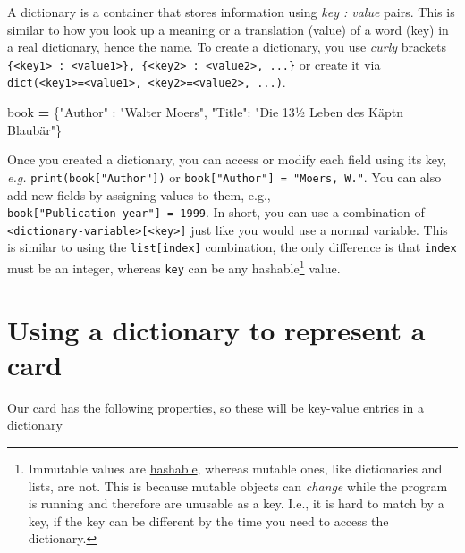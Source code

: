 \documentclass[
]{book}
\newenvironment{Shaded}{\begin{snugshade}}{\end{snugshade}}
\newcommand{\NormalTok}[1]{#1}
\newcommand{\OperatorTok}[1]{\textcolor[rgb]{0.81,0.36,0.00}{\textbf{#1}}}
\newcommand{\StringTok}[1]{\textcolor[rgb]{0.31,0.60,0.02}{#1}}
\begin{document}
A dictionary is a container that stores information using \emph{key : value} pairs. This is similar to how you look up a meaning or a translation (value) of a word (key) in a real dictionary, hence the name. To create a dictionary, you use \emph{curly} brackets \texttt{\{\textless{}key1\textgreater{}\ :\ \textless{}value1\textgreater{}\},\ \{\textless{}key2\textgreater{}\ :\ \textless{}value2\textgreater{},\ ...\}} or create it via \texttt{dict(\textless{}key1\textgreater{}=\textless{}value1\textgreater{},\ \textless{}key2\textgreater{}=\textless{}value2\textgreater{},\ ...)}.

\begin{Shaded}
\begin{Highlighting}[]
\NormalTok{book }\OperatorTok{=}\NormalTok{ \{}\StringTok{"Author"}\NormalTok{ : }\StringTok{"Walter Moers"}\NormalTok{,}
        \StringTok{"Title"}\NormalTok{: }\StringTok{"Die 13½ Leben des Käpt\textquotesingle{}n Blaubär"}\NormalTok{\}}
\end{Highlighting}
\end{Shaded}

Once you created a dictionary, you can access or modify each field using its key, \emph{e.g.} \texttt{print(book{[}"Author"{]})} or \texttt{book{[}"Author"{]}\ =\ "Moers,\ W."}. You can also add new fields by assigning values to them, e.g., \texttt{book{[}"Publication\ year"{]}\ =\ 1999}. In short, you can use a combination of \texttt{\textless{}dictionary-variable\textgreater{}{[}\textless{}key\textgreater{}{]}} just like you would use a normal variable. This is similar to using the \texttt{list{[}index{]}} combination, the only difference is that \texttt{index} must be an integer, whereas \texttt{key} can be any hashable\footnote{Immutable values are \href{https://docs.python.org/3/glossary.html\#term-hashable}{hashable}, whereas mutable ones, like dictionaries and lists, are not. This is because mutable objects can \emph{change} while the program is running and therefore are unusable as a key. I.e., it is hard to match by a key, if the key can be different by the time you need to access the dictionary.} value.

\hypertarget{using-a-dictionary-to-represent-a-card}{%
\section{Using a dictionary to represent a card}\label{using-a-dictionary-to-represent-a-card}}

Our card has the following properties, so these will be key-value entries in a dictionary
\end{document}
